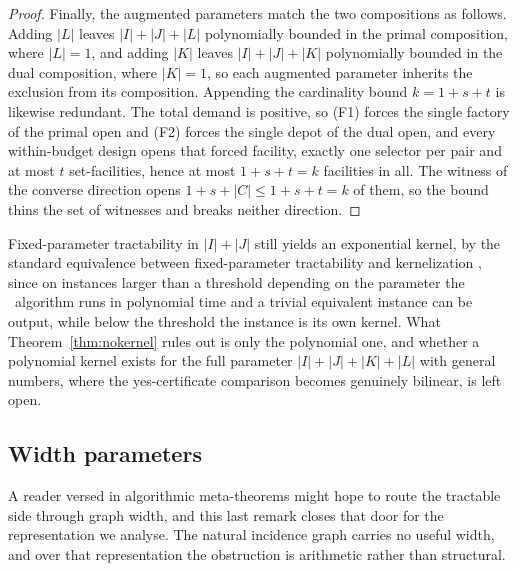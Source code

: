 \begin{proof}
Finally, the augmented parameters
match the two compositions as follows. Adding $|L|$ leaves
$|I|+|J|+|L|$ polynomially bounded in the primal composition, where
$|L|=1$, and adding $|K|$ leaves $|I|+|J|+|K|$ polynomially bounded in
the dual composition, where $|K|=1$, so each augmented parameter
inherits the exclusion from its composition. Appending the cardinality
bound $k=1+s+t$ is likewise redundant. The total demand is positive, so
(F1) forces the single factory of the primal open and (F2) forces the
single depot of the dual open, and every within-budget design opens that
forced facility, exactly one selector per pair and at most $t$
set-facilities, hence at most $1+s+t=k$ facilities in all. The witness
of the converse direction opens $1+s+|C|\le 1+s+t=k$ of them, so the
bound thins the set of witnesses and breaks
neither direction.
\end{proof}

Fixed-parameter tractability in $|I|+|J|$ still yields an exponential
kernel, by the standard equivalence between fixed-parameter
tractability and kernelization \citep[e.g.][]{Cygan2015}, since on
instances larger than a threshold depending on the parameter the \FPT\
algorithm runs in polynomial time and a trivial equivalent instance can
be output, while below the threshold the instance is its own kernel. What
Theorem~\ref{thm:nokernel} rules out is only the polynomial one, and
whether a polynomial kernel exists for the full parameter
$|I|+|J|+|K|+|L|$ with general numbers, where the yes-certificate
comparison becomes genuinely bilinear, is left open.

\subsection{Width parameters}\label{sec:width}

A reader versed in algorithmic meta-theorems might hope to route the
tractable side through graph width, and this last remark closes that door
for the representation we analyse.
The natural incidence graph carries no useful width, and over that
representation the obstruction
is arithmetic rather than structural.

